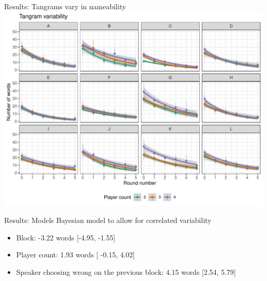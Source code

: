 \documentclass[ 12pt, xcolor=beamer,table,usenames,dvipsnames, ignorenonframetext, ngerman]{beamer}
\begin{document}
\begin{frame}{\large Results: Tangrams vary in nameability}
	\includegraphics[width=\textwidth]{../images/words_tangrams.pdf}
\end{frame}

\begin{frame}{\large Results: Models}
	Bayesian model to allow for correlated variability
	\begin{itemize}
		\item Block: -3.22 words [-4.95, -1.55]
		\item Player count: 1.93 words [ -0.15, 4.02]
		\item Speaker choosing wrong on the previous block: 4.15 words [2.54, 5.79]
	\end{itemize}

	\end{frame}
\end{document}
